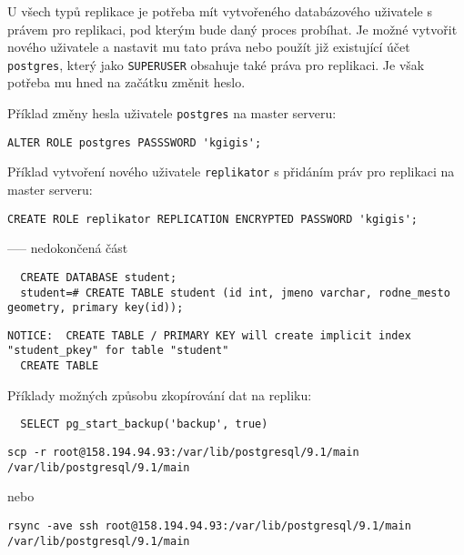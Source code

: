       U všech typů replikace je potřeba mít vytvořeného databázového uživatele s právem pro replikaci, pod kterým bude daný proces probíhat. Je možné vytvořit nového uživatele a nastavit mu tato práva nebo použít již existující účet \texttt{postgres}, který jako \texttt{SUPERUSER} obsahuje také práva pro replikaci. Je však potřeba mu hned na začátku změnit heslo.

Příklad změny hesla uživatele \texttt{postgres} na master serveru:
\begin{lstlisting}
ALTER ROLE postgres PASSSWORD 'kgigis';
\end{lstlisting}

Příklad vytvoření nového uživatele \texttt{replikator} s přidáním práv pro replikaci na master serveru: 
\begin{lstlisting}
CREATE ROLE replikator REPLICATION ENCRYPTED PASSWORD 'kgigis';
\end{lstlisting}

----- nedokončená část

\begin{lstlisting}
  CREATE DATABASE student;
  student=# CREATE TABLE student (id int, jmeno varchar, rodne_mesto geometry, primary key(id));
\end{lstlisting}
\begin{lstlisting}[keywordstyle=\color{black},identifierstyle=\color{black},stringstyle=\color{black}]
  NOTICE:  CREATE TABLE / PRIMARY KEY will create implicit index "student_pkey" for table "student"
  CREATE TABLE
\end{lstlisting}

Příklady možných způsobu zkopírování dat na repliku:
\begin{lstlisting}
  SELECT pg_start_backup('backup', true)
\end{lstlisting}

\begin{lstlisting}[keywordstyle=\bfseries\color{purpurova7},identifierstyle=\color{black},stringstyle=\color{black}]
  scp -r root@158.194.94.93:/var/lib/postgresql/9.1/main /var/lib/postgresql/9.1/main
\end{lstlisting}
\begin{center}
nebo 
\end{center}
\begin{lstlisting}[keywordstyle=\bfseries\color{purpurova7},identifierstyle=\color{black},stringstyle=\color{black}]
  rsync -ave ssh root@158.194.94.93:/var/lib/postgresql/9.1/main /var/lib/postgresql/9.1/main
\end{lstlisting}

